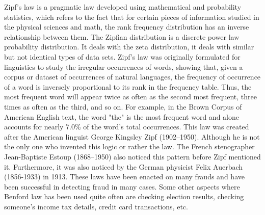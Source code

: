 \documentclass[conference]{IEEEtran}
\begin{document}
Zipf's law is a pragmatic law developed using mathematical and probability statistics, which refers to the fact that for certain pieces of information studied in the physical sciences and math, the rank frequency distribution has an inverse relationship between them. The Zipfian distribution is a discrete power law probability distribution. It deals with the zeta distribution, it deals with similar but not identical types of data sets. Zipf's law was originally formulated for linguistics to study the irregular occurrences of words, showing that, given a corpus or dataset of occurrences of natural languages, the frequency of occurrence of a word is inversely proportional to its rank in the frequency table. Thus, the most frequent word will appear twice as often as the second most frequent, three times as often as the third, and so on. For example, in the Brown Corpus of American English text, the word "the" is the most frequent word and alone accounts for nearly 7.0\% of the word's total occurrences. This law was created after the American linguist George Kingsley Zipf (1902–1950). Although he is not the only one who invented this logic or rather the law. The French stenographer Jean-Baptiste Estoup (1868–1950) also noticed this pattern before Zipf mentioned it. Furthermore, it was also noticed by the German physicist Felix Auerbach (1856-1933) in 1913. These laws have been enacted on many frauds and have been successful in detecting fraud in many cases. Some other aspects where Benford law has been used quite often are checking election results, checking someone's income tax details, credit card transactions, etc. 
\end{document}
